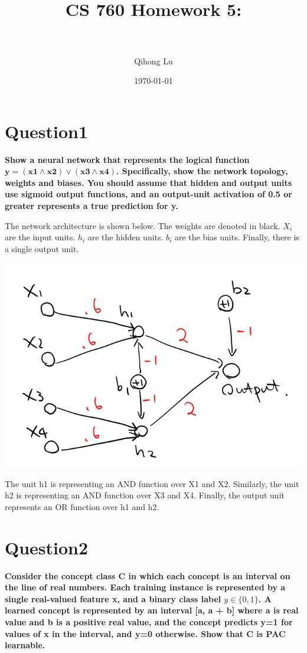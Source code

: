 \documentclass[paper=a4, fontsize=11pt]{scrartcl} %
\title{	
\normalfont \normalsize 
\horrule{0.5pt} \\[0.4cm] %
\huge CS 760 Homework 5:\\ %
\horrule{2pt} \\[0.5cm] %
}
\author{Qihong Lu} %
\date{\normalsize\today} %
\numberwithin{equation}{section} %
\numberwithin{figure}{section} %
\numberwithin{table}{section} %
\begin{document}
\maketitle %

\section*{Question1}
\textbf{
Show a neural network that represents the logical function $\mathbf{y = (x1 \land x2) \lor (x3 \land x4)}$. Specifically, show the network topology, weights and biases. You should assume that hidden and output units use sigmoid output functions, and an output-unit activation of 0.5 or greater represents a true prediction for y.\\ 
}

The network architecture is shown below. The weights are denoted in black. $X_i$ are the input units. $h_i$ are the hidden units. $b_i$ are the bias units. Finally, there is a single output unit. 

\begin{center}
	\includegraphics[scale=.4]{pics/hw5-1.png}
\end{center}


The unit h1 is representing an AND function over X1 and X2. 
Similarly, the unit h2 is representing an AND function over X3 and X4. Finally, the output unit represents an OR function over h1 and h2. 

\newpage
\section*{Question2}
\textbf{Consider the concept class C in which each concept is an interval on the line of real numbers. Each training instance is represented by a single real-valued feature x, and a binary class label \boldmath$y \in \{0, 1\}$. A learned concept is represented by an interval [a, a + b] where a is real value and b is a positive real value, and the concept predicts y=1 for values of x in the interval, and y=0 otherwise. Show that C is PAC learnable.}
\bigbreak
\end{document}
